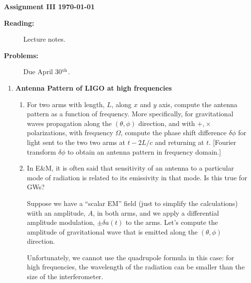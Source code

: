 \documentclass[12pt,twoside]{article}
\begin{document}
%
\centerline{\large\bf  \hfill Assignment III \hfill  \today}

\medskip
\begin{description}
\item[{\bf Reading:}] Lecture notes. \\
\item[{\bf Problems:} \hfill ] Due April 30$^{\rm th}$.
\end{description}


\medskip

\begin{enumerate}

\item  {\bf  Antenna Pattern of LIGO at high frequencies}
\begin{enumerate}
\item For two arms with length, $L$, along $x$ and $y$ axis,
  compute the antenna pattern as a function of frequency.
  More specifically, for gravitational waves propagation along the
  $(\theta,\phi)$ direction, and with $+,\times$ polarizations, with  frequency $\Omega$, compute the phase shift difference $\delta\phi$ for light  sent to the two two arms at $t - 2 L/c$ and returning at $t$.
  [Fourier transform $\delta\phi$ to obtain an antenna pattern in frequency domain.]

\item In E\&M, it is often said that sensitivity of an antenna to a particular mode of radiation is related to its emissivity in that mode.
  Is this true for GWs?  

  Suppose we have a ``scalar EM'' field (just to simplify the calculations) wiith an amplitude, $A$, in both arms, and we apply a differential amplitude modulation, $\pm \delta a(t)$ to the arms.
  Let's compute the amplitude of gravitational wave that is emitted along the $(\theta,\phi)$ direction.  

  Unfortunately, we cannot use the quadrupole formula in this case:
  for high frequencies, the wavelength of the radiation can be smaller than the size of the interferometer.


\end{enumerate}
\end{enumerate}
\end{document}
